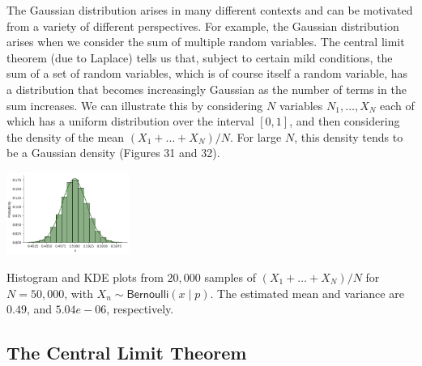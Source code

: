 \documentclass{tufte-handout}
\begin{document}
The Gaussian distribution arises in many different contexts and can be motivated from a variety of different perspectives. For example,  the Gaussian distribution arises when we consider the sum of multiple random variables. The central limit theorem (due to Laplace) tells us that, subject to certain mild conditions, the sum of a set of random variables, which is of course itself a random variable, has a distribution that becomes increasingly Gaussian as the number of terms in the sum increases. We can illustrate this by considering $N$ variables $N_1, \dots, X_N$ each of which has a uniform distribution over the interval $[0, 1]$, and then considering the density of the mean $(X_1 + \dots + X_N )/N$. For large $N$, this density tends to be a Gaussian density (Figures 31 and 32). 

\begin{marginfigure}
\centering
\includegraphics[width=4cm]{fig/G.png}
\caption{Histogram and KDE plots from $20,000$ samples of $(X_1 + \dots + X_N )/N$ for $N=50,000$, with $X_n\sim \mathsf{Bernoulli}(x\mid p)$.
The estimated mean and variance are $0.49$,  and $5.04e-06$, respectively.
}
\end{marginfigure}

\subsection{The Central Limit Theorem}
\end{document}
